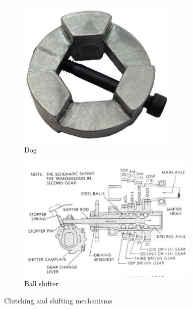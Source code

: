 \documentclass[10pt,letterpaper]{book}
\begin{document}
\begin{figure}[H]
\begin{subfigure}[b]{.32\linewidth}
		\includegraphics[width=0.85\textwidth]{imgs/shifting_dog.png}
		\caption{Dog}
	\end{subfigure}
	
	\begin{subfigure}[b]{.60\linewidth}
		\includegraphics[width=0.95\textwidth]{imgs/ball_shifter.png}
		\caption{Ball shifter}
	\end{subfigure}
	\caption{Clutching and shifting mechanisms}
\end{figure}
\end{document}
